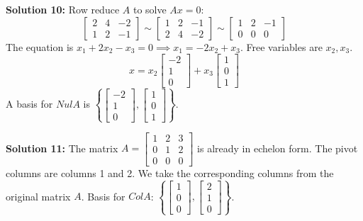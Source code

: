 \documentclass[11pt]{article}
\begin{document}
\vspace{0.3cm}
\textbf{Solution 10:} Row reduce $A$ to solve $Ax = 0$:
$$ \begin{bmatrix} 2 & 4 & -2 \\ 1 & 2 & -1 \end{bmatrix} \sim \begin{bmatrix} 1 & 2 & -1 \\ 2 & 4 & -2 \end{bmatrix} \sim \begin{bmatrix} 1 & 2 & -1 \\ 0 & 0 & 0 \end{bmatrix} $$
The equation is $x_1 + 2x_2 - x_3 = 0 \implies x_1 = -2x_2 + x_3$. Free variables are $x_2, x_3$.
$$ x = x_2 \begin{bmatrix} -2 \\ 1 \\ 0 \end{bmatrix} + x_3 \begin{bmatrix} 1 \\ 0 \\ 1 \end{bmatrix} $$
A basis for $Nul A$ is $\left\{ \begin{bmatrix} -2 \\ 1 \\ 0 \end{bmatrix}, \begin{bmatrix} 1 \\ 0 \\ 1 \end{bmatrix} \right\}$.

\vspace{0.3cm}
\textbf{Solution 11:} The matrix $A = \begin{bmatrix} 1 & 2 & 3 \\ 0 & 1 & 2 \\ 0 & 0 & 0 \end{bmatrix}$ is already in echelon form. The pivot columns are columns 1 and 2. We take the corresponding columns from the original matrix $A$.
Basis for $Col A$: $\left\{ \begin{bmatrix} 1 \\ 0 \\ 0 \end{bmatrix}, \begin{bmatrix} 2 \\ 1 \\ 0 \end{bmatrix} \right\}$.
\end{document}
